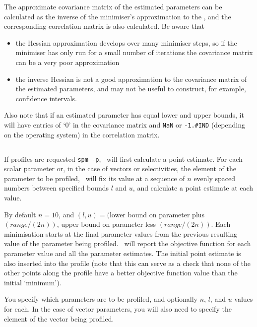 The approximate covariance matrix of the estimated parameters can be calculated as the inverse of the minimiser's approximation to the , and the corresponding correlation matrix is also calculated. Be aware that

\begin{itemize}
\item the Hessian approximation develops over many minimiser steps, so if the minimiser has only run for a small number of iterations the covariance matrix can be a very poor approximation
\item the inverse Hessian is not a good approximation to the covariance matrix of the estimated parameters, and may not be useful to construct, for example, confidence intervals. 
\end{itemize}

Also note that if an estimated parameter has equal lower and upper bounds, it will have entries of `0' in the covariance matrix and \texttt{NaN} or \texttt{-1.\#IND} (depending on the operating system) in the correlation matrix. 

\subsection{\label{sec:estimate-profiles}}

If profiles are requested \texttt{spm -p}, \SPM\ will first calculate a point estimate. For each scalar parameter or, in the case of vectors or selectivities, the element of the parameter to be profiled, \SPM\ will fix its value at a sequence of $n$ evenly spaced numbers between specified bounds $l$ and $u$, and calculate a point estimate at each value. 

By default $n=10$, and $(l, u)=($lower bound on parameter plus $(range/(2n))$, upper bound on parameter less $(range/(2n))$. Each minimisation starts at the final parameter values from the previous resulting value of the parameter being profiled. \SPM\ will report the objective function for each parameter value and all the parameter estimates. The initial point estimate is also inserted into the profile (note that this can serve as a check that none of the other points along the profile have a better objective function value than the initial `minimum').

You specify which parameters are to be profiled, and optionally $n$, $l$, and $u$ values for each. In the case of vector parameters, you will also need to specify the element of the vector being profiled. 

